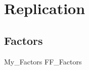 
\section{Replication} \label{sec:repl}

\subsection{\textcite{fama2016dissecting, fama2016choosing} Factors} \label{sec:repl.FF2016}

{My_Factors}
{FF_Factors}

